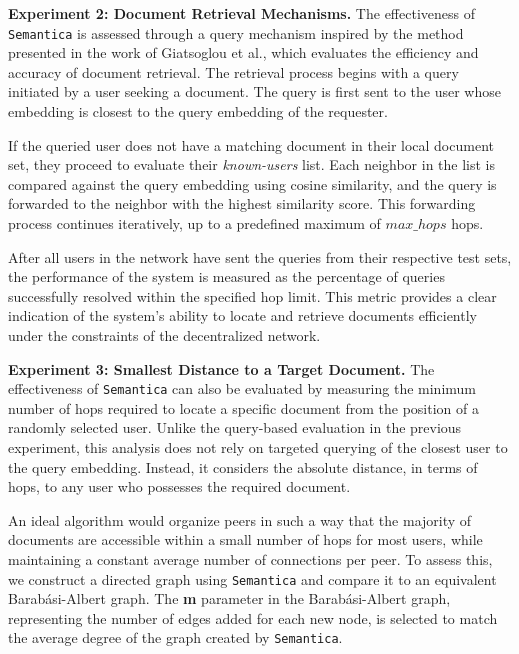 \documentclass[10pt,journal]{IEEEtran}
\newcommand{\algorithmname}{\texttt{Semantica}}
\begin{document}
\textbf{Experiment 2: Document Retrieval Mechanisms.}
The effectiveness of \algorithmname{} is assessed through a query mechanism inspired by the method presented in the work of Giatsoglou et al.\cite{giatsoglou2022graph}, which evaluates the efficiency and accuracy of document retrieval. The retrieval process begins with a query initiated by a user seeking a document. The query is first sent to the user whose embedding is closest to the query embedding of the requester. 

If the queried user does not have a matching document in their local document set, they proceed to evaluate their \textit{known-users} list. Each neighbor in the list is compared against the query embedding using cosine similarity, and the query is forwarded to the neighbor with the highest similarity score. This forwarding process continues iteratively, up to a predefined maximum of \textbf{$max\_hops$} hops.

After all users in the network have sent the queries from their respective test sets, the performance of the system is measured as the percentage of queries successfully resolved within the specified hop limit. This metric provides a clear indication of the system’s ability to locate and retrieve documents efficiently under the constraints of the decentralized network.

\textbf{Experiment 3: Smallest Distance to a Target Document.}
The effectiveness of \algorithmname{} can also be evaluated by measuring the minimum number of hops required to locate a specific document from the position of a randomly selected user. Unlike the query-based evaluation in the previous experiment, this analysis does not rely on targeted querying of the closest user to the query embedding. Instead, it considers the absolute distance, in terms of hops, to any user who possesses the required document.

An ideal algorithm would organize peers in such a way that the majority of documents are accessible within a small number of hops for most users, while maintaining a constant average number of connections per peer. To assess this, we construct a directed graph using \algorithmname{} and compare it to an equivalent Barabási-Albert graph. The \textbf{m} parameter in the Barabási-Albert graph, representing the number of edges added for each new node, is selected to match the average degree of the graph created by \algorithmname{}.
\end{document}
